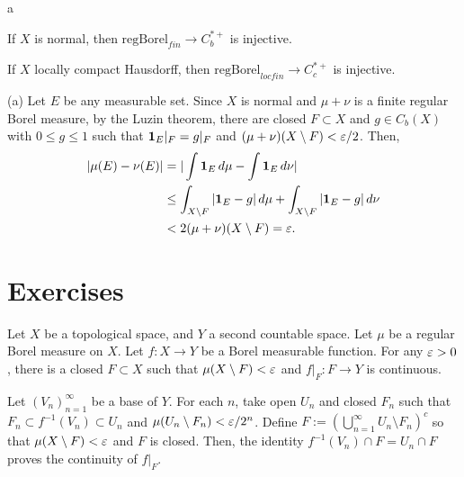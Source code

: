 \documentclass{../../large}
\begin{document}
\begin{prb}
a
\begin{parts}
\item If $X$ is normal, then $\text{regBorel}_{fin}\to C_b^{*+}$ is injective.
\item If $X$ locally compact Hausdorff, then $\text{regBorel}_{locfin}\to C_c^{*+}$ is injective.
\end{parts}
\end{prb}
\begin{pf}
(a)
Let $E$ be any measurable set.
Since $X$ is normal and $\mu+\nu$ is a finite regular Borel measure, by the Luzin theorem, there are closed $F\subset X$ and $g\in C_b(X)$ with $0\le g\le1$ such that $\mathbf{1}_E|_F=g|_F$ and $(\mu+\nu)(X\setminus F)<\varepsilon/2$.
Then,
\begin{align*}
|\mu(E)-\nu(E)|&=|\int\mathbf{1}_E\,d\mu-\int\mathbf{1}_E\,d\nu|\\
&\le\int_{X\setminus F}|\mathbf{1}_E-g|\,d\mu+\int_{X\setminus F}|\mathbf{1}_E-g|\,d\nu\\
&<2(\mu+\nu)(X\setminus F)=\varepsilon.
\end{align*}

\end{pf}


\begin{prb}
\end{prb}



\section*{Exercises}

\begin{prb}
Let $X$ be a topological space, and $Y$ a second countable space.
Let $\mu$ be a regular Borel measure on $X$.
Let $f:X\to Y$ be a Borel measurable function.
For any $\varepsilon>0$, there is a closed $F\subset X$ such that $\mu(X\setminus F)<\varepsilon$ and $f|_F:F\to Y$ is continuous.
\end{prb}
\begin{pf}
Let $(V_n)_{n=1}^\infty$ be a base of $Y$.
For each $n$, take open $U_n$ and closed $F_n$ such that $F_n\subset f^{-1}(V_n)\subset U_n$ and $\mu(U_n\setminus F_n)<\varepsilon/2^n$.
Define $F:=\left(\bigcup_{n=1}^\infty U_n\setminus F_n\right)^c$ so that $\mu(X\setminus F)<\varepsilon$ and $F$ is closed.
Then, the identity $f^{-1}(V_n)\cap F=U_n\cap F$ proves the continuity of $f|_F$.
\end{pf}
\end{document}
